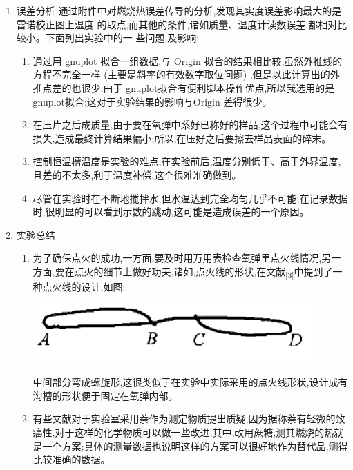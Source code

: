 \documentclass[11pt]{report}
\begin{document}
\begin{enumerate}
\item 误差分析
\label{sec:orge896f6c}
通过附件中对燃烧热误差传导的分析,发现其实度误差影响最大的是雷诺校正图上温度
的取点,而其他的条件,诸如质量、温度计读数误差,都相对比较小。下面列出实验中的一
些问题,及影响:
\begin{enumerate}
\item 通过用 gnuplot 拟合一组数据,与 Origin 拟合的结果相比较,虽然外推线的方程不完全一样 (主要是斜率的有效数字取位问题) ,但是以此计算出的外推点差的也很少,由于 gnuplot拟合有便利脚本操作优点,所以我选用的是gnuplot拟合;这对于实验结果的影响与Origin 差得很少。
\item 在压片之后成质量,由于要在氧弹中系好已称好的样品,这个过程中可能会有损失,造成最终计算结果偏小;所以,在压好之后要擦去样品表面的碎末。
\item 控制恒温槽温度是实验的难点,在实验前后,温度分别低于、高于外界温度,且差的不太多,利于温度补偿,这个很难准确做到。
\item 尽管在实验时在不断地搅拌水,但水温达到完全均匀几乎不可能,在记录数据时,很明显的可以看到示数的跳动,这可能是造成误差的一个原因。
\end{enumerate}
\item 实验总结
\label{sec:org3141cf6}

\begin{enumerate}
\item 为了确保点火的成功,一方面,要及时用万用表检查氧弹里点火线情况,另一方面,要在点火的细节上做好功夫,诸如,点火线的形状,在文献\textsubscript{[3]}中提到了一种点火线的设计,如图:
\begin{center}
\includegraphics[width=.9\linewidth]{../img/4.png}
\end{center}中间部分弯成螺旋形,这很类似于在实验中实际采用的点火线形状,设计成有沟槽的形状便于固定在氧弹内部。
\item 有些文献对于实验室采用萘作为测定物质提出质疑,因为据称萘有轻微的致癌性,对于这样的化学物质可以做一些改进,其中,改用蔗糖,测其燃烧的热就是一个方案;具体的测量数据也说明这样的方案可以很好地作为替代品,测得比较准确的数据。
\end{enumerate}
\end{enumerate}
\end{document}

